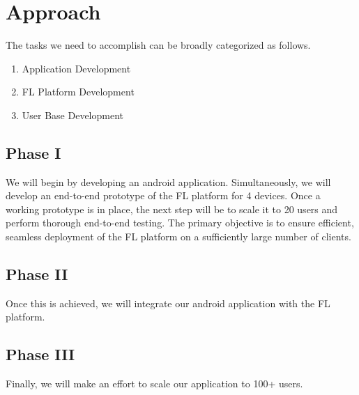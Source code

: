 \section{Approach}
    The tasks we need to accomplish can be broadly categorized as follows. \newline

    \begin{enumerate}
        \item Application Development
        \item FL Platform Development
        \item User Base Development
    \end{enumerate}

    \subsection{Phase I}
    We will begin by developing an android application.
    Simultaneously, we will develop an end-to-end prototype of the FL platform for 4 devices.
    Once a working prototype is in place, the next step will be to scale it to 20 users and perform thorough end-to-end testing.
    The primary objective is to ensure efficient, seamless deployment of the FL platform on a sufficiently large number of clients.
    \subsection{Phase II}
    Once this is achieved, we will integrate our android application with the FL platform.
    \subsection{Phase III}
    Finally, we will make an effort to scale our application to 100+ users.

    \begin{table}[t]
        
    \end{table}

